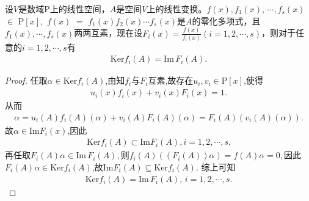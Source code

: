 \documentclass[../../main.tex]{subfiles}%
\begin{document}
\begin{corollary}
设$V$是数域$\mathrm{P}$上的线性空间，$A$是空间$V$上的线性变换。$f(x),$$f_1(x)$, $\cdots,$$f_s(x)$ $\in $ $\mathrm{P}[x],$ $f(x)$ $=$ $f_1(x)f_2(x)\cdots f_s(x)$是$A$的零化多项式，且$f_1(x), \cdots, f_s(x)$两两互素，现在设$F_i(x) = \frac{f(x)}{f_i(x)}$$(i = 1, 2, \cdots, s)$，则对于任意的$i = 1, 2, \cdots, s$有
\begin{align*}
\text{Ker} f_i(A) = \text{Im}\, F_i(A).
\end{align*}
\end{corollary}
\begin{proof}
任取$\alpha \in \text{Ker}f_i(A)$,由知$f_i$与$F_i$互素,故存在$u_i,v_i\in \mathrm{P}[x]$,使得
\begin{align*}
u_i(x)f_i(x)+v_i(x)F_i(x)=1.
\end{align*}
从而
\begin{align*}
\alpha=u_i(A)f_i(A)(\alpha) + v_i(A)F_i(A)(\alpha) =  F_i(A)(v_i(A)(\alpha)).
\end{align*}
故$\alpha \in \text{Im}F_i(x)$,因此
\begin{align}\label{eq::9-k3434g2g}
\text{Ker}f_i(A)\subset \text{Im}F_i(A),i=1,2,\cdots,s.
\end{align}
再任取$F_i(A)\alpha \in \text{Im}\, F_i(A),$则$f_i(A)((F_i(A))\alpha)=f(A)\alpha=0,$因此$F_i(A)\alpha\in \text{Ker}f_i(A)$,故$\text{Im}F_i(A)\subseteq \text{Ker}f_i(A)$.
综上可知
\begin{align*}
\text{Ker} f_i(A) = \text{Im}\, F_i(A),\,i=1,2,\cdots,s.
\end{align*}
\end{proof}
\end{document}
